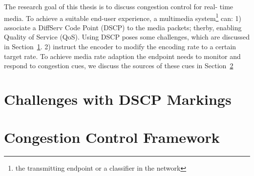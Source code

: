 
The research goal of this thesis is to discuss congestion control for real-
time media. To achieve a suitable end-user experience, a multimedia
system\footnote{the transmitting endpoint or a classifier in the network} can:
1) associate a DiffServ Code Point (DSCP) to the media packets; therby,
enabling Quality of Service (QoS). Using DSCP poses some challenges, which are
discussed in Section~\ref{rg.ch.dscp}. 2) instruct the encoder to modify the
encoding rate to a certain target rate. To achieve media rate adaption the
endpoint needs to monitor and respond to congestion cues, we discuss the
sources of these cues in Section~\ref{rg.ch.cc.fw}


\section{Challenges with DSCP Markings}
\label{rg.ch.dscp}




\section{Congestion Control Framework}
\label{rg.ch.cc.fw}
